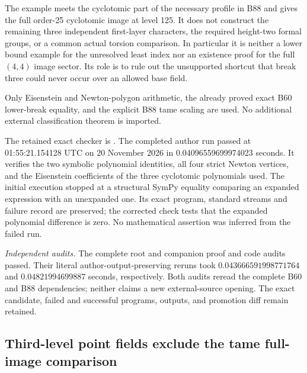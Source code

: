 \begin{remark}
\label{rem:B-RD89-scope}
The example meets the cyclotomic part of the necessary
profile in B88 and gives the full order-25 cyclotomic
image at level 125. It does not construct the remaining
three independent first-layer characters, the required
height-two formal groups, or a common actual torsion
comparison. In particular it is neither a lower bound
example for the unresolved least index nor an existence
proof for the full \((4,4)\) image sector. Its role is
to rule out the unsupported shortcut that break three
could never occur over an allowed base field.

Only Eisenstein and Newton-polygon arithmetic, the
already proved exact B60 lower-break equality, and
the explicit B88 tame scaling are used. No additional
external classification theorem is imported.

The retained exact checker is
.
The completed author run passed at 01:55:21.154128 UTC
on 20 November 2026 in 0.04096559699974023 seconds.
It verifies the two symbolic polynomial identities,
all four strict Newton vertices, and the Eisenstein
coefficients of the three cyclotomic polynomials used.
The initial execution stopped at a structural SymPy
equality comparing an expanded expression with an
unexpanded one. Its exact program, standard streams
and failure record are preserved; the corrected check
tests that the expanded polynomial difference is zero.
No mathematical assertion was inferred from the failed run.

\smallskip
\noindent\emph{Independent audits.}
The complete root and companion proof and code audits passed.
Their literal author-output-preserving reruns took
\(0.043666591998771764\) and
\(0.04821994699887\) seconds, respectively.
Both audits reread the complete B60 and B88 dependencies;
neither claims a new external-source opening. The exact
candidate, failed and successful programs, outputs, and
promotion diff remain retained.
\end{remark}


\subsection{Third-level point fields exclude the tame full-image comparison}

